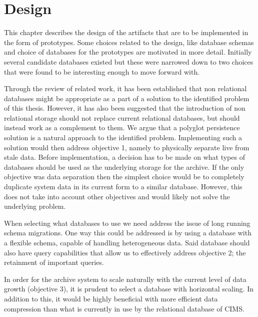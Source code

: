 \chapter{Design}
\label{chap:design}


This chapter describes the design of the artifacts that are to be implemented in the form of prototypes. Some choices related to the design, like database schemas and choice of databases for the prototypes are motivated in more detail. Initially several candidate databases existed but these were narrowed down to two choices that were found to be interesting enough to move forward with. 

Through the review of related work, it has been established that non relational databases might be appropriate as a part of a solution to the identified problem of this thesis. However, it has also been suggested \cite{NoSQLSurvey} that the introduction of non relational storage should not replace current relational databases, but should instead work as a complement to them. We argue that a polyglot persistence solution is a natural approach to the identified problem. Implementing such a solution would then address objective 1, namely to physically separate live from stale data. Before implementation, a decision has to be made on what types of databases should be used as the underlying storage for the archive. If the only objective was data separation then the simplest choice would be to completely duplicate system data in its current form to a similar database. However, this does not take into account other objectives and would likely not solve the underlying problem. 

When selecting what databases to use we need address the issue of long running schema migrations. One way this could be addressed is by using a database with a flexible schema, capable of handling heterogeneous data. Said database should also have query capabilities that allow us to effectively address objective 2; the retainment of important queries.

In order for the archive system to scale naturally with the current level of data growth (objective 3), it is prudent to select a database with horizontal scaling. In addition to this, it would be highly beneficial with more efficient data compression than what is currently in use by the relational database of CIMS.

